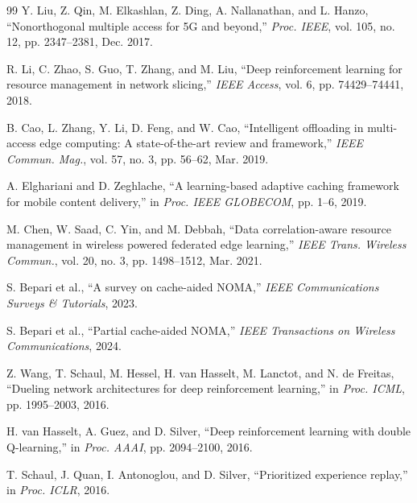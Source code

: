 \documentclass[12pt,a4paper]{article}
\begin{document}
\begin{thebibliography}{99}
Y. Liu, Z. Qin, M. Elkashlan, Z. Ding, A. Nallanathan, and L. Hanzo, ``Nonorthogonal multiple access for 5G and beyond,'' \textit{Proc. IEEE}, vol. 105, no. 12, pp. 2347--2381, Dec. 2017.

R. Li, C. Zhao, S. Guo, T. Zhang, and M. Liu, ``Deep reinforcement learning for resource management in network slicing,'' \textit{IEEE Access}, vol. 6, pp. 74429--74441, 2018.

B. Cao, L. Zhang, Y. Li, D. Feng, and W. Cao, ``Intelligent offloading in multi-access edge computing: A state-of-the-art review and framework,'' \textit{IEEE Commun. Mag.}, vol. 57, no. 3, pp. 56--62, Mar. 2019.

A. Elghariani and D. Zeghlache, ``A learning-based adaptive caching framework for mobile content delivery,'' in \textit{Proc. IEEE GLOBECOM}, pp. 1--6, 2019.

M. Chen, W. Saad, C. Yin, and M. Debbah, ``Data correlation-aware resource management in wireless powered federated edge learning,'' \textit{IEEE Trans. Wireless Commun.}, vol. 20, no. 3, pp. 1498--1512, Mar. 2021.

S. Bepari et al., ``A survey on cache-aided NOMA,'' \textit{IEEE Communications Surveys \& Tutorials}, 2023.

S. Bepari et al., ``Partial cache-aided NOMA,'' \textit{IEEE Transactions on Wireless Communications}, 2024.

Z. Wang, T. Schaul, M. Hessel, H. van Hasselt, M. Lanctot, and N. de Freitas, ``Dueling network architectures for deep reinforcement learning,'' in \textit{Proc. ICML}, pp. 1995--2003, 2016.

H. van Hasselt, A. Guez, and D. Silver, ``Deep reinforcement learning with double Q-learning,'' in \textit{Proc. AAAI}, pp. 2094--2100, 2016.

T. Schaul, J. Quan, I. Antonoglou, and D. Silver, ``Prioritized experience replay,'' in \textit{Proc. ICLR}, 2016.

\end{thebibliography}

\thispagestyle{plain}
\end{document}
